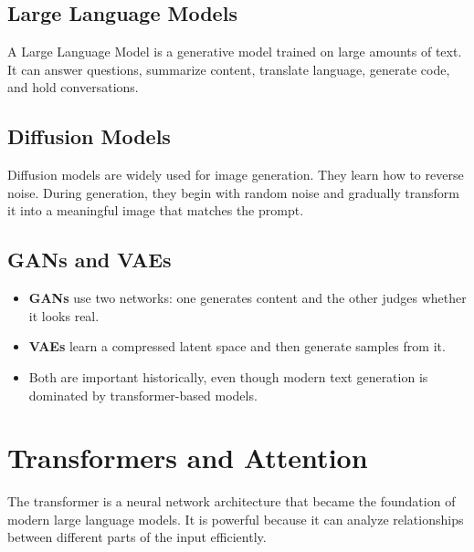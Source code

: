 \documentclass[11pt,a4paper]{article}
\begin{document}
\subsection{Large Language Models}

\begin{definitionbox}[LLM]
A Large Language Model is a generative model trained on large amounts of text. It can answer questions, summarize content, translate language, generate code, and hold conversations.
\end{definitionbox}

\subsection{Diffusion Models}

\begin{definitionbox}
Diffusion models are widely used for image generation. They learn how to reverse noise. During generation, they begin with random noise and gradually transform it into a meaningful image that matches the prompt.
\end{definitionbox}

\subsection{GANs and VAEs}

\begin{itemize}[leftmargin=*]
  \item \textbf{GANs} use two networks: one generates content and the other judges whether it looks real.
  \item \textbf{VAEs} learn a compressed latent space and then generate samples from it.
  \item Both are important historically, even though modern text generation is dominated by transformer-based models.
\end{itemize}

\section{Transformers and Attention}

\begin{definitionbox}[Transformer]
The transformer is a neural network architecture that became the foundation of modern large language models. It is powerful because it can analyze relationships between different parts of the input efficiently.
\end{definitionbox}
\end{document}
